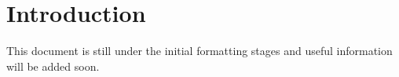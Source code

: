 \chapter{Introduction}
\thispagestyle{fancy}

This document is still under the initial formatting stages and useful information will be added soon.